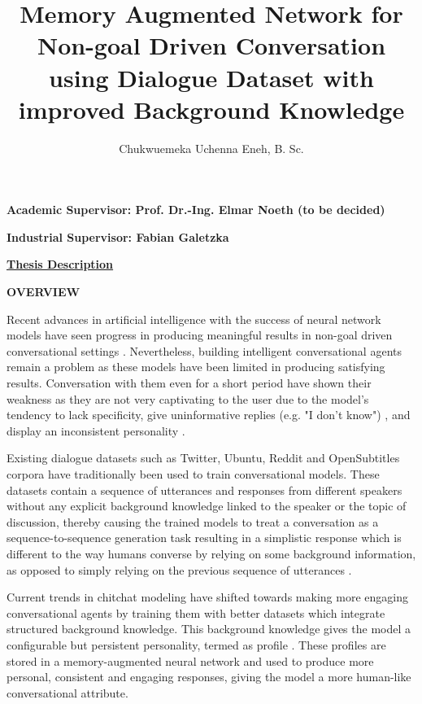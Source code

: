 \documentclass[paper=a4,11pt,parskip=half,toc=listof]{scrartcl}
\title{Memory Augmented Network for Non-goal Driven Conversation using Dialogue Dataset with improved Background Knowledge}
\author{Chukwuemeka Uchenna Eneh, B. Sc.}
\begin{document}
	\maketitle
	
	\textbf{Academic Supervisor: Prof. Dr.-Ing. Elmar Noeth (to be decided)}
	
	\textbf{Industrial Supervisor: Fabian Galetzka}
	
	
	\underline{\textbf{Thesis Description}}
	
	\textbf{OVERVIEW}
	
	Recent advances in artificial intelligence with the success of neural network models have seen progress in producing meaningful results in non-goal driven conversational settings \cite{vinyals2015neural}. Nevertheless, building intelligent conversational agents remain a problem as these models have been limited in producing satisfying results. Conversation with them even for a short period have shown their weakness as they are not very captivating to the user due to the model's tendency to lack specificity, give uninformative replies (e.g. "I don't know") \cite{li2015diversity}, and display an inconsistent personality \cite{serban2016generative, vinyals2015neural}.
	
	Existing dialogue datasets such as Twitter, Ubuntu, Reddit and OpenSubtitles corpora \cite{serban2015survey} have traditionally been used to train conversational models. These datasets contain a sequence of utterances and responses from different speakers without any explicit background knowledge linked to the speaker or the topic of discussion, thereby causing the trained models to treat a conversation as a sequence-to-sequence generation task resulting in a simplistic response \cite{li2015diversity} which is different to the way humans converse by relying on some background information, as opposed to simply relying on the previous sequence of utterances \cite{moghe2018towards}. 
	
	Current trends in chitchat modeling have shifted towards making more engaging conversational agents by training them with better datasets which integrate structured background knowledge. This background knowledge gives the model a configurable but persistent personality, termed as profile \cite{zhang2018personalizing}. These profiles are stored in a memory-augmented neural network \cite{miller2016key, kumar2016ask} and used to produce more personal, consistent and engaging responses, giving the model a more human-like conversational attribute.
	
\end{document}
